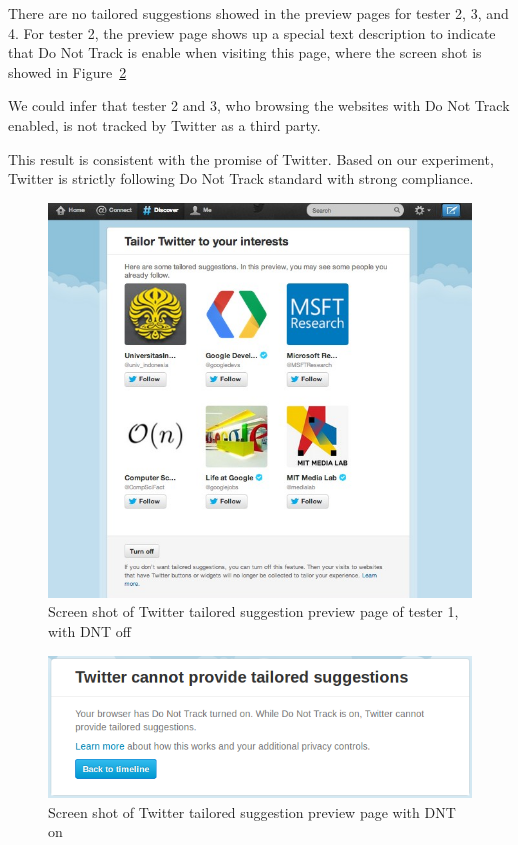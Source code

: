 \documentclass{sig-alternate}
\begin{document}
There are no tailored suggestions showed in the preview pages for tester 2, 3, and 4. For tester 2, the preview page shows up a special text description to indicate that Do Not Track is enable when visiting this page, where the screen shot is showed in Figure~\ref{fig:dnton}

We could infer that tester 2 and 3, who browsing the websites with Do Not Track enabled, is not tracked by Twitter as a third party.

This result is consistent with the promise of Twitter. Based on our experiment, Twitter is strictly following Do Not Track standard with strong compliance.
\begin{figure}
\begin{center}
\includegraphics[width=0.9\columnwidth]{twitter}
\end{center}
\caption{Screen shot of Twitter tailored suggestion preview page of tester 1, with DNT off}
\label{fig:twitter}
\end{figure}

\begin{figure}
\begin{center}
\includegraphics[width=0.9\columnwidth]{dnton}
\end{center}
\caption{Screen shot of Twitter tailored suggestion preview page with DNT on}
\label{fig:dnton}
\end{figure}
\end{document}

